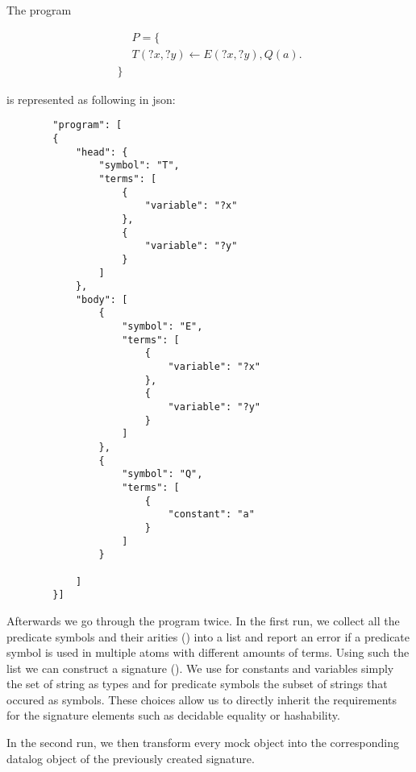 \begin{example}
    The program 

    \begin{equation}
        \begin{split}
            &P = \{  \\
            &T(?x,?y) \leftarrow E(?x,?y), Q(a).\\
            \}
        \end{split}
    \end{equation}

    is represented as following in json:

    \begin{lstlisting}
        "program": [
        {
            "head": {
                "symbol": "T",
                "terms": [
                    {
                        "variable": "?x"
                    },
                    {
                        "variable": "?y"
                    }
                ]
            },
            "body": [
                {
                    "symbol": "E",
                    "terms": [
                        {
                            "variable": "?x"
                        },
                        {
                            "variable": "?y"
                        }
                    ]
                },
                {
                    "symbol": "Q",
                    "terms": [
                        {
                            "constant": "a"
                        }
                    ]
                }

            ]
        }]
    \end{lstlisting}
\end{example}

Afterwards we go through the program twice. In the first run, we collect all the predicate symbols and their arities (\parsingArityHelper) into a list and report an error if a predicate symbol is used in multiple atoms with different amounts of terms. Using such the list we can construct a signature (\parsingSignature). We use for constants and variables simply the set of string as types and for predicate symbols the subset of strings that occured as symbols. These choices allow us to directly inherit the requirements for the signature elements such as decidable equality or hashability. 

In the second run, we then transform every mock object into the corresponding datalog object of the previously created signature. 

